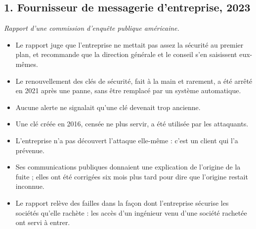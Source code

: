 \documentclass[11pt,a4paper]{article}
\begin{document}
\subsection*{1. Fournisseur de messagerie d'entreprise, 2023}
\textit{Rapport d'une commission d'enquête publique américaine.}
\begin{itemize}[itemsep=2pt]
\item Le rapport juge que l'entreprise ne mettait pas assez la sécurité au premier plan, et
      recommande que la direction générale et le conseil s'en saisissent eux-mêmes.
\item Le renouvellement des clés de sécurité, fait à la main et rarement, a été arrêté en 2021
      après une panne, sans être remplacé par un système automatique.
\item Aucune alerte ne signalait qu'une clé devenait trop ancienne.
\item Une clé créée en 2016, censée ne plus servir, a été utilisée par les attaquants.
\item L'entreprise n'a pas découvert l'attaque elle-même : c'est un client qui l'a prévenue.
\item Ses communications publiques donnaient une explication de l'origine de la fuite ; elles ont
      été corrigées six mois plus tard pour dire que l'origine restait inconnue.
\item Le rapport relève des failles dans la façon dont l'entreprise sécurise les sociétés qu'elle
      rachète : les accès d'un ingénieur venu d'une société rachetée ont servi à entrer.
\end{itemize}
\end{document}
